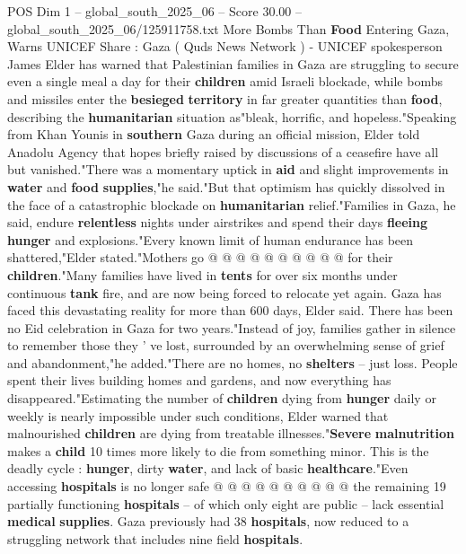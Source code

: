 \begin{textsample}{POS Dim 1 – global\_south\_2025\_06 – Score 30.00 – global\_south\_2025\_06/125911758.txt}  \label{ex:f1_pos_139}
More Bombs Than \textbf{Food} Entering Gaza, Warns UNICEF Share : Gaza ( Quds News Network ) - UNICEF spokesperson James Elder has warned that Palestinian families in Gaza are struggling to secure even a single meal a day for their \textbf{children} amid Israeli blockade, while bombs and missiles enter the \textbf{besieged} \textbf{territory} in far greater quantities than \textbf{food}, describing the \textbf{humanitarian} situation as"bleak, horrific, and hopeless."Speaking from Khan Younis in \textbf{southern} Gaza during an official mission, Elder told Anadolu Agency that hopes briefly raised by discussions of a ceasefire have all but vanished."There was a momentary uptick in \textbf{aid} and slight improvements in \textbf{water} and \textbf{food} \textbf{supplies},"he said."But that optimism has quickly dissolved in the face of a catastrophic blockade on \textbf{humanitarian} relief."Families in Gaza, he said, endure \textbf{relentless} nights under airstrikes and spend their days \textbf{fleeing} \textbf{hunger} and explosions."Every known limit of human endurance has been shattered,"Elder stated."Mothers go @ @ @ @ @ @ @ @ @ @ for their \textbf{children}."Many families have lived in \textbf{tents} for over six months under continuous \textbf{tank} fire, and are now being forced to relocate yet again.
Gaza has faced this devastating reality for more than 600 days, Elder said.
There has been no Eid celebration in Gaza for two years."Instead of joy, families gather in silence to remember those they ' ve lost, surrounded by an overwhelming sense of grief and abandonment,"he added."There are no homes, no \textbf{shelters} -- just loss.
People spent their lives building homes and gardens, and now everything has disappeared."Estimating the number of \textbf{children} dying from \textbf{hunger} daily or weekly is nearly impossible under such conditions, Elder warned that malnourished \textbf{children} are dying from treatable illnesses."\textbf{Severe} \textbf{malnutrition} makes a \textbf{child} 10 times more likely to die from something minor.
This is the deadly cycle : \textbf{hunger}, dirty \textbf{water}, and lack of basic \textbf{healthcare}."Even accessing \textbf{hospitals} is no longer safe @ @ @ @ @ @ @ @ @ @ the remaining 19 partially functioning \textbf{hospitals} -- of which only eight are public -- lack essential \textbf{medical} \textbf{supplies}.
Gaza previously had 38 \textbf{hospitals}, now reduced to a struggling network that includes nine field \textbf{hospitals}.

\end{textsample}
